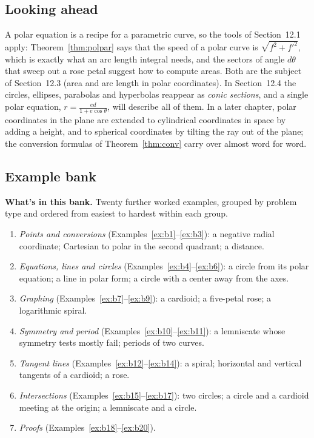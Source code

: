 \documentclass[11pt]{article}
\begin{document}
\subsection*{Looking ahead}

A polar equation is a recipe for a parametric curve, so the tools of Section~12.1 apply: Theorem~\ref{thm:polpar} says that the speed of a polar curve is $\sqrt{f^2+f'^2}$, which is exactly what an arc length integral needs, and the sectors of angle $d\theta$ that sweep out a rose petal suggest how to compute areas. Both are the subject of Section~12.3 (area and arc length in polar coordinates). In Section~12.4 the circles, ellipses, parabolas and hyperbolas reappear as \emph{conic sections}, and a single polar equation, $r=\frac{ed}{1+e\cos\theta}$, will describe all of them. In a later chapter, polar coordinates in the plane are extended to cylindrical coordinates in space by adding a height, and to spherical coordinates by tilting the ray out of the plane; the conversion formulas of Theorem~\ref{thm:conv} carry over almost word for word.

\subsection*{Example bank}

\textbf{What's in this bank.} Twenty further worked examples, grouped by problem type and ordered from easiest to hardest within each group.
\begin{enumerate}[nosep]
  \item \emph{Points and conversions} (Examples~\ref{ex:b1}--\ref{ex:b3}): a negative radial coordinate; Cartesian to polar in the second quadrant; a distance.
  \item \emph{Equations, lines and circles} (Examples~\ref{ex:b4}--\ref{ex:b6}): a circle from its polar equation; a line in polar form; a circle with a center away from the axes.
  \item \emph{Graphing} (Examples~\ref{ex:b7}--\ref{ex:b9}): a cardioid; a five-petal rose; a logarithmic spiral.
  \item \emph{Symmetry and period} (Examples~\ref{ex:b10}--\ref{ex:b11}): a lemniscate whose symmetry tests mostly fail; periods of two curves.
  \item \emph{Tangent lines} (Examples~\ref{ex:b12}--\ref{ex:b14}): a spiral; horizontal and vertical tangents of a cardioid; a rose.
  \item \emph{Intersections} (Examples~\ref{ex:b15}--\ref{ex:b17}): two circles; a circle and a cardioid meeting at the origin; a lemniscate and a circle.
  \item \emph{Proofs} (Examples~\ref{ex:b18}--\ref{ex:b20}).
\end{enumerate}
\end{document}
